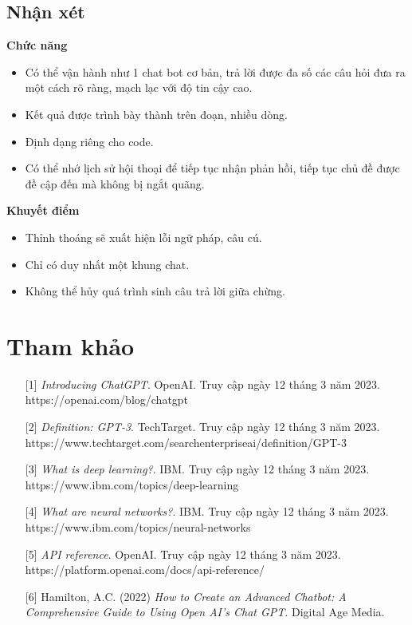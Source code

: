\documentclass[a4paper, 12pt]{article}
\begin{document}
	\subsection{Nhận xét}
	\textbf{Chức năng}\\
	\begin{itemize}
		\item Có thể vận hành như 1 chat bot cơ bản, trả lời được đa số các câu hỏi đưa ra một cách rõ ràng, mạch lạc với độ tin cậy cao.
		\item Kết quả được trình bày thành trên đoạn, nhiều dòng.
		\item Định dạng riêng cho code.
		\item Có thể nhớ lịch sử hội thoại để tiếp tục nhận phản hồi, tiếp tục chủ đề được đề cập đến mà không bị ngắt quãng.
	\end{itemize}
	\vspace{1,5cm}
	\textbf{Khuyết điểm}\\
	\begin{itemize}
		\item Thỉnh thoáng sẽ xuất hiện lỗi ngữ pháp, câu cú.
		\item Chỉ có duy nhất một khung chat.
		\item Không thể hủy quá trình sinh câu trả lời giữa chừng.
	\end{itemize}
		
	\section{Tham khảo}
	\begin{itemize}
		\item[ {[1]} ] \textit{Introducing ChatGPT}. OpenAI. Truy cập ngày 12 tháng 3 năm 2023.\\ https://openai.com/blog/chatgpt 
		
		\item[ {[2]}] \textit{Definition: GPT-3}. TechTarget. Truy cập ngày 12 tháng 3 năm 2023.\\
		https://www.techtarget.com/searchenterpriseai/definition/GPT-3
		
		\item[{[3]}] \textit{What is deep learning?}. IBM. Truy cập ngày 12 tháng 3 năm 2023.\\
		https://www.ibm.com/topics/deep-learning
		
		\item[{[4]}] \textit{What are neural networks?}. IBM. Truy cập ngày 12 tháng 3 năm 2023.\\
		https://www.ibm.com/topics/neural-networks
		
		\item[{[5]}] \textit{API reference}. OpenAI. Truy cập ngày 12 tháng 3 năm 2023.\\
		https://platform.openai.com/docs/api-reference/
		
		\item[{[6]}] Hamilton, A.C. (2022) \textit{How to Create an  Advanced Chatbot: A Comprehensive Guide to Using Open AI's Chat GPT}. Digital Age Media.
		
		
			
	\end{itemize}
\end{document}
